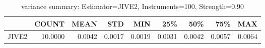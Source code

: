 \begin{table}[ht]
\centering
\caption{variance summary: Estimator=JIVE2, Instruments=100, Strength=0.90}
\begin{tabular}{lrrrrrrrr}
\toprule
 & COUNT & MEAN & STD & MIN & 25\% & 50\% & 75\% & MAX \\
\midrule
JIVE2 & 10.0000 & 0.0042 & 0.0017 & 0.0019 & 0.0031 & 0.0042 & 0.0057 & 0.0064 \\
\bottomrule
\end{tabular}
\end{table}
